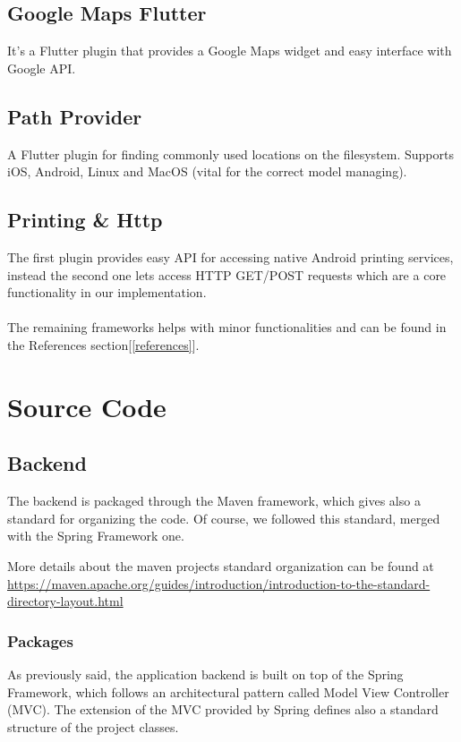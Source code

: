 \documentclass[table, 12pt]{article}
\begin{document}
\subsection{Google Maps Flutter}
It's a Flutter plugin that provides a Google Maps widget and easy interface with Google API.\\
\subsection{Path Provider}
A Flutter plugin for finding commonly used locations on the filesystem. Supports iOS, Android, Linux and MacOS (vital for the correct model managing).
\subsection{Printing \& Http}
The first plugin provides easy API for accessing native Android printing services, instead the second one lets access HTTP GET/POST requests which are a core functionality in our implementation.\\\\

The remaining frameworks helps with minor functionalities and can be found in the References section[\ref{references}].\newpage
\section{Source Code}
\subsection{Backend}
The backend is packaged through the Maven framework, which gives also a standard for organizing the code. Of course, we followed this standard, merged with the Spring Framework one.

More details about the maven projects standard organization can be found at \href{https://maven.apache.org/guides/introduction/introduction-to-the-standard-directory-layout.html}{https://maven.apache.org/guides/introduction/introduction-to-the-standard-directory-layout.html}
\subsubsection{Packages}
As previously said, the application backend is built on top of the Spring Framework, which follows an architectural pattern called Model View Controller (MVC). The extension of the MVC provided by Spring defines also a standard structure of the project classes.
\end{document}

